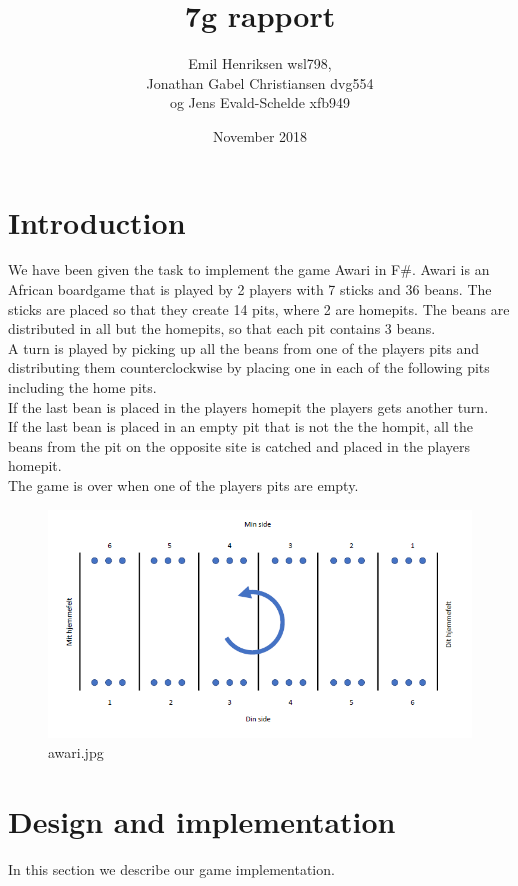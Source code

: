 \documentclass{article}
\title{7g rapport}
\author{Emil Henriksen wsl798,\\ Jonathan Gabel Christiansen dvg554\\ og Jens Evald-Schelde  xfb949}
\date{November 2018}
\begin{document}
\maketitle
\newpage
\section*{Introduction}
We have been given the task to implement the game Awari in F\#.
Awari is an African boardgame that is played by 2 players with 7 sticks and 36 beans. The sticks are placed so that they create 14 pits, where 2 are homepits. The beans are distributed in all but the homepits, so that each pit contains 3 beans.\\
A turn is played by picking up all the beans from one of the players pits and distributing them counterclockwise by placing one in each of the following pits including the home pits.\\
If the last bean is placed in the players homepit the players gets another turn.\\
If the last bean is placed in an empty pit that is not the the hompit, all the beans from the pit on the opposite site is catched and placed in the players homepit.\\
The game is over when one of the players pits are empty.

\begin{figure}[h]
  \includegraphics[width=\linewidth]{awari.jpg}
  \caption{awari.jpg}
  \label{fig:A picture of Awari}
\end{figure}

\section{Design and implementation}
In this section we describe our game implementation.\\
\end{document}

